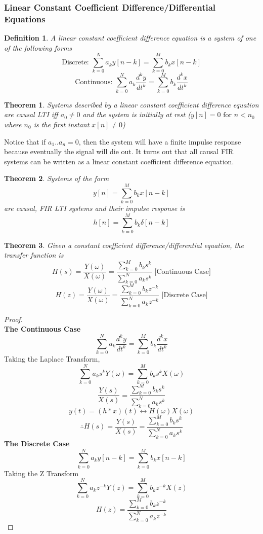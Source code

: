 \documentclass{article}
\newtheorem{theorem}{Theorem}
\newtheorem{definition}{Definition}
\newtheorem{proof}{Proof}
\begin{document}
\subsubsection{Linear Constant Coefficient Difference/Differential Equations}
\begin{definition}
    A linear constant coefficient difference equation is a system of one of the following forms
    $$\text{Discrete: } \sum_{k=0}^{N}{a_k y[n-k]} = \sum_{k=0}^{M}{b_k x[n-k]}$$
    $$\text{Continuous: } \sum_{k=0}^{N}{a_k\frac{d^ky}{dt^k}} = \sum_{k=0}^{M}{b_k\frac{d^kx}{dt^k}}$$
\end{definition}
\begin{theorem}
    Systems described by a linear constant coefficient difference equation are causal LTI iff $a_0 \ne 0$
    and the system is initially at rest ($y[n] = 0 \text{ for } n < n_0$ where $n_0$ is the first instant $x[n] \ne 0$)
\end{theorem}
Notice that if $a_1..a_n = 0$, then the system will have a finite impulse response because eventually the signal will die out.
It turns out that all causal FIR systems can be written as a linear constant coefficient difference equation.
\begin{theorem}
    Systems of the form
    $$y[n] = \sum_{k=0}^{M}{b_k x[n-k]}$$ are causal, FIR LTI systems and their impulse response is
    $$h[n] = \sum_{k=0}^{M}{b_k \delta[n-k]}$$
\end{theorem}
\begin{theorem}
    Given a constant coefficient difference/differential equation, the transfer function is
    $$H(s) = \frac{Y(\omega)}{X(\omega)} = \frac{\sum_{k=0}^{M}{b_ks^k}}{\sum_{k=0}^{N}{a_ks^k}}\text{ [Continuous Case]}$$
    $$H(z) = \frac{Y(\omega)}{X(\omega)} = \frac{\sum_{k=0}^{M}{b_kz^{-k}}}{\sum_{k=0}^{N}{a_kz^{-k}}}\text{ [Discrete Case]}$$
\end{theorem}
\begin{proof}
    \textbf{\\The Continuous Case}
    $$\sum_{k=0}^{N}{a_k\frac{d^ky}{dt^k}} = \sum_{k=0}^{M}{b_k\frac{d^kx}{dt^k}}$$
    Taking the Laplace Transform,
    $$\sum_{k=0}^{N}{a_ks^k Y(\omega)} = \sum_{k=0}^{M}{b_ks^k X(\omega)}$$
    $$\frac{Y(s)}{X(s)} = \frac{\sum_{k=0}^{M}{b_ks^k}}{\sum_{k=0}^{N}{a_ks^k}}$$
    $$y(t) = (h*x)(t) \leftrightarrow H(\omega)X(\omega)$$
    $$\therefore H(s) = \frac{Y(s)}{X(s)} = \frac{\sum_{k=0}^{M}{b_ks^k}}{\sum_{k=0}^{N}{a_ks^k}}$$
    \textbf{The Discrete Case}
    $$\sum_{k=0}^{N}{a_k y[n-k]} = \sum_{k=0}^{M}{b_k x[n-k]}$$
    Taking the Z Transform
    $$\sum_{k=0}^{N}{a_k z^{-k}Y(z)} = \sum_{k=0}^{M}{b_k z^{-k}X(z)}$$
    $$H(z) = \frac{\sum_{k=0}^{M}{b_k z^{-k}}}{\sum_{k=0}^{N}{a_k z^{-k}}}$$
\end{proof}
\end{document}
